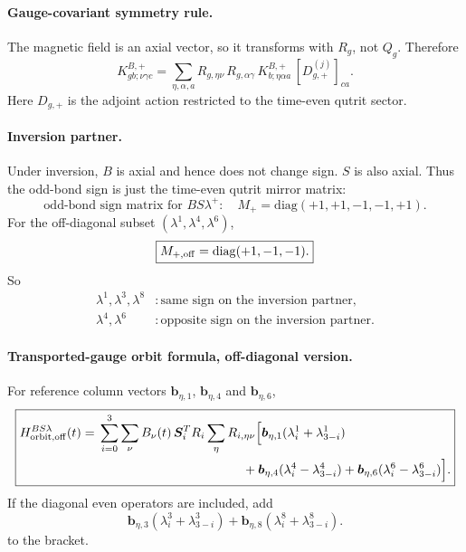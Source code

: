 \documentclass[11pt,a4paper]{article}
\newcommand{\diag}{\mathrm{diag}}
\newcommand{\ve}[1]{\boldsymbol{#1}}
\begin{document}
\paragraph{Gauge-covariant symmetry rule.}
The magnetic field is an axial vector, so it transforms with $R_g$, not $Q_g$.  Therefore
\begin{equation}
  \boxed{
  K^{B,+}_{gb;\nu\gamma c}
  =\sum_{\eta,\alpha,a}
  R_{g,\eta\nu}\,R_{g,\alpha\gamma}\,
  K^{B,+}_{b;\eta\alpha a}\,
  \left[D_{g,+}^{(j)}\right]_{ca}.}
  \label{eq:BSlambda-covariance}
\end{equation}
Here $D_{g,+}$ is the adjoint action restricted to the time-even qutrit sector.

\paragraph{Inversion partner.}
Under inversion, $B$ is axial and hence does not change sign.  $S$ is also axial.  Thus the odd-bond sign is just the time-even qutrit mirror matrix:
\begin{equation}
  \boxed{
  \text{odd-bond sign matrix for }B S\lambda^+:
  \quad M_+=\diag(+1,+1,-1,-1,+1).}
\end{equation}
For the off-diagonal subset $(\lambda^1,\lambda^4,\lambda^6)$,
\begin{equation}
  \boxed{M_{+,\rm off}=\diag(+1,-1,-1).}
\end{equation}
So
\begin{align}
  \lambda^1,\lambda^3,\lambda^8 &: \text{same sign on the inversion partner},\\
  \lambda^4,\lambda^6 &: \text{opposite sign on the inversion partner}.
\end{align}

\paragraph{Transported-gauge orbit formula, off-diagonal version.}
For reference column vectors $\ve b_{\eta,1}$, $\ve b_{\eta,4}$ and $\ve b_{\eta,6}$,
\begin{equation}
\boxed{
\begin{aligned}
H^{BS\lambda}_{\rm orbit,off}(t)
={}&\sum_{i=0}^{3}\sum_\nu B_\nu(t)\,
\ve S_i^TR_i
\sum_\eta R_{i,\eta\nu}
\Big[
\ve b_{\eta,1}(\lambda_i^1+\lambda_{3-i}^1)\\
&\hspace{4.0cm}
+\ve b_{\eta,4}(\lambda_i^4-\lambda_{3-i}^4)
+\ve b_{\eta,6}(\lambda_i^6-\lambda_{3-i}^6)
\Big].
\end{aligned}}
\label{eq:BSlambda-orbit}
\end{equation}
If the diagonal even operators are included, add
\begin{equation}
  \ve b_{\eta,3}(\lambda_i^3+\lambda_{3-i}^3)
  +\ve b_{\eta,8}(\lambda_i^8+\lambda_{3-i}^8).
\end{equation}
to the bracket.
\end{document}
